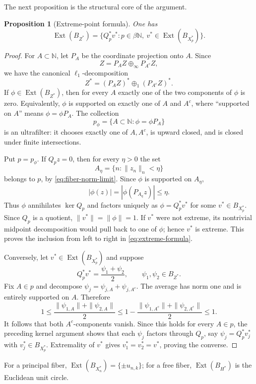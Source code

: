\documentclass[11pt]{article}
\newtheorem{proposition}[theorem]{Proposition}
\theoremstyle{definition}
\newcommand{\N}{\mathbb N}
\newcommand{\Ext}{\operatorname{Ext}}
\begin{document}
The next proposition is the structural core of the argument.

\begin{proposition}[Extreme-point formula]\label{prop:extreme}
One has
\begin{equation}\label{eq:extreme-formula}
 \Ext(B_{Z^*})
 =\bigl\{Q_p^*v^*:p\in\beta\N,
          \ v^*\in\Ext(B_{X_p^*})\bigr\}.
\end{equation}
\end{proposition}

\begin{proof}
For $A\subset\N$, let $P_A$ be the coordinate projection onto $A$.  Since
\[
 Z=P_AZ\oplus_\infty P_{A^c}Z,
\]
we have the canonical $\ell_1$-decomposition
\[
 Z^*=(P_AZ)^*\oplus_1(P_{A^c}Z)^*.
\]
If $\phi\in\Ext(B_{Z^*})$, then for every $A$ exactly one of the two
components of $\phi$ is zero.  Equivalently, $\phi$ is supported on exactly
one of $A$ and $A^c$, where ``supported on $A$'' means
$\phi=\phi P_A$.  The collection
\[
   p_\phi=\{A\subset\N:\phi=\phi P_A\}
\]
is an ultrafilter: it chooses exactly one of $A,A^c$, is upward closed, and
is closed under finite intersections.

Put $p=p_\phi$.  If $Q_pz=0$, then for every $\eta>0$ the set
\[
 A_\eta=\{n:\|z_n\|_n<\eta\}
\]
belongs to $p$, by \eqref{eq:fiber-norm-limit}.  Since $\phi$ is supported
on $A_\eta$,
\[
  |\phi(z)|=|\phi(P_{A_\eta}z)|\le\eta.
\]
Thus $\phi$ annihilates $\ker Q_p$ and factors uniquely as
$\phi=Q_p^*v^*$ for some $v^*\in B_{X_p^*}$.  Since $Q_p$ is a quotient,
$\|v^*\|=\|\phi\|=1$.  If $v^*$ were not extreme, its nontrivial midpoint
decomposition would pull back to one of $\phi$; hence $v^*$ is extreme.
This proves the inclusion from left to right in \eqref{eq:extreme-formula}.

Conversely, let $v^*\in\Ext(B_{X_p^*})$ and suppose
\[
 Q_p^*v^*=\frac{\psi_1+\psi_2}{2},\qquad \psi_1,\psi_2\in B_{Z^*}.
\]
Fix $A\in p$ and decompose $\psi_j=\psi_{j,A}+\psi_{j,A^c}$.  The average
has norm one and is entirely supported on $A$.  Therefore
\[
 1\le\frac{\|\psi_{1,A}\|+\|\psi_{2,A}\|}{2}
 \le1-\frac{\|\psi_{1,A^c}\|+\|\psi_{2,A^c}\|}{2}\le1.
\]
It follows that both $A^c$-components vanish.  Since this holds for every
$A\in p$, the preceding kernel argument shows that each $\psi_j$ factors
through $Q_p$, say $\psi_j=Q_p^*v_j^*$ with $v_j^*\in B_{X_p^*}$.
Extremality of $v^*$ gives $v_1^*=v_2^*=v^*$, proving the converse.
\end{proof}

For a principal fiber, $\Ext(B_{X_n^*})=\{\pm u_{n,k}\}$; for a free fiber,
$\Ext(B_{H^*})$ is the Euclidean unit circle.
\end{document}

